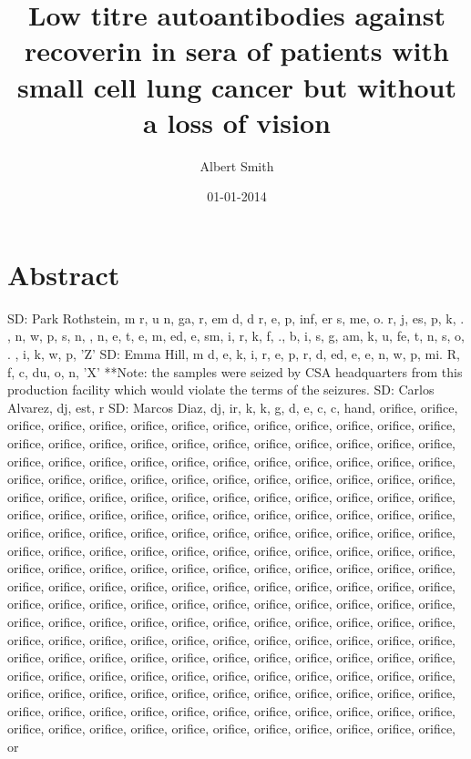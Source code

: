 \documentclass{article}%
\title{Low titre autoantibodies against recoverin in sera of patients with small cell lung cancer but without a loss of vision}%
\author{Albert Smith}%
\affil{Institute of Orthopedic Surgery, Xijing Hospital, Fourth Military Medical University, Xian, Peoples Republic of China}%
\date{01{-}01{-}2014}%
\begin{document}
%
\normalsize%
\maketitle%
\section{Abstract}%
\label{sec:Abstract}%
SD: Park Rothstein, m r, u n, ga, r, em d, d r, e, p, inf, er s, me, o. r, j, es, p, k, . , n, w, p, s, n, , n, e, t, e, m, ed, e, sm, i, r, k, f, ., b, i, s, g, am, k, u, fe, t, n, s, o, . , i, k, w, p, 'Z'\newline%
SD: Emma Hill, m d, e, k, i, r, e, p, r, d, ed, e, e, n, w, p, mi. R, f, c, du, o, n, 'X'\newline%
**Note: the samples were seized by CSA headquarters from this production facility which would violate the terms of the seizures. SD: Carlos Alvarez, dj, est, r\newline%
SD: Marcos Diaz, dj, ir, k, k, g, d, e, c, c, hand, orifice, orifice, orifice, orifice, orifice, orifice, orifice, orifice, orifice, orifice, orifice, orifice, orifice, orifice, orifice, orifice, orifice, orifice, orifice, orifice, orifice, orifice, orifice, orifice, orifice, orifice, orifice, orifice, orifice, orifice, orifice, orifice, orifice, orifice, orifice, orifice, orifice, orifice, orifice, orifice, orifice, orifice, orifice, orifice, orifice, orifice, orifice, orifice, orifice, orifice, orifice, orifice, orifice, orifice, orifice, orifice, orifice, orifice, orifice, orifice, orifice, orifice, orifice, orifice, orifice, orifice, orifice, orifice, orifice, orifice, orifice, orifice, orifice, orifice, orifice, orifice, orifice, orifice, orifice, orifice, orifice, orifice, orifice, orifice, orifice, orifice, orifice, orifice, orifice, orifice, orifice, orifice, orifice, orifice, orifice, orifice, orifice, orifice, orifice, orifice, orifice, orifice, orifice, orifice, orifice, orifice, orifice, orifice, orifice, orifice, orifice, orifice, orifice, orifice, orifice, orifice, orifice, orifice, orifice, orifice, orifice, orifice, orifice, orifice, orifice, orifice, orifice, orifice, orifice, orifice, orifice, orifice, orifice, orifice, orifice, orifice, orifice, orifice, orifice, orifice, orifice, orifice, orifice, orifice, orifice, orifice, orifice, orifice, orifice, orifice, orifice, orifice, orifice, orifice, orifice, orifice, orifice, orifice, orifice, orifice, orifice, orifice, orifice, orifice, orifice, orifice, orifice, orifice, orifice, orifice, orifice, orifice, orifice, orifice, orifice, orifice, orifice, orifice, orifice, orifice, orifice, orifice, orifice, orifice, orifice, orifice, orifice, orifice, orifice, orifice, orifice, orifice, orifice, orifice, orifice, orifice, orifice, orifice, orifice, orifice, or
\end{document}
